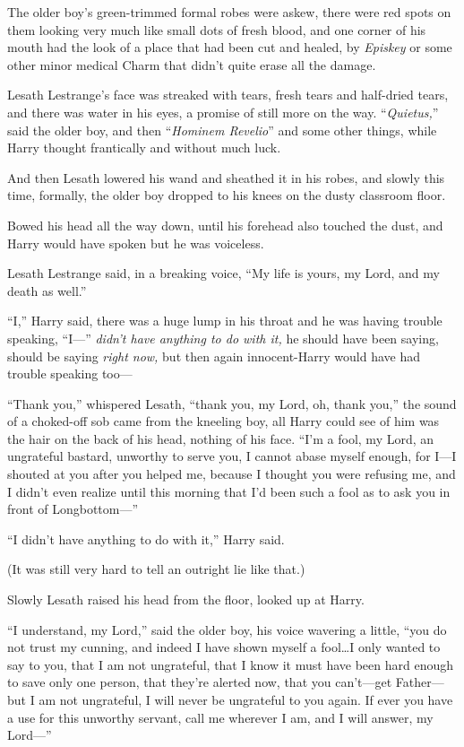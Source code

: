 The older boy’s green-trimmed formal robes were askew, there were red spots on them looking very much like small dots of fresh blood, and one corner of his mouth had the look of a place that had been cut and healed, by \emph{Episkey} or some other minor medical Charm that didn’t quite erase all the damage.

Lesath Lestrange’s face was streaked with tears, fresh tears and half-dried tears, and there was water in his eyes, a promise of still more on the way. “\emph{Quietus,}” said the older boy, and then “\emph{Hominem Revelio}” and some other things, while Harry thought frantically and without much luck.

And then Lesath lowered his wand and sheathed it in his robes, and slowly this time, formally, the older boy dropped to his knees on the dusty classroom floor.

Bowed his head all the way down, until his forehead also touched the dust, and Harry would have spoken but he was voiceless.

Lesath Lestrange said, in a breaking voice, “My life is yours, my Lord, and my death as well.”

“I,” Harry said, there was a huge lump in his throat and he was having trouble speaking, “I—” \emph{didn’t have anything to do with it,} he should have been saying, should be saying \emph{right now,} but then again innocent-Harry would have had trouble speaking too—

“Thank you,” whispered Lesath, “thank you, my Lord, oh, thank you,” the sound of a choked-off sob came from the kneeling boy, all Harry could see of him was the hair on the back of his head, nothing of his face. “I’m a fool, my Lord, an ungrateful bastard, unworthy to serve you, I cannot abase myself enough, for I—I shouted at you after you helped me, because I thought you were refusing me, and I didn’t even realize until this morning that I’d been such a fool as to ask you in front of Longbottom—”

“I didn’t have anything to do with it,” Harry said.

(It was still very hard to tell an outright lie like that.)

Slowly Lesath raised his head from the floor, looked up at Harry.

“I understand, my Lord,” said the older boy, his voice wavering a little, “you do not trust my cunning, and indeed I have shown myself a fool…I only wanted to say to you, that I am not ungrateful, that I know it must have been hard enough to save only one person, that they’re alerted now, that you can’t—get Father—but I am not ungrateful, I will never be ungrateful to you again. If ever you have a use for this unworthy servant, call me wherever I am, and I will answer, my Lord—”

